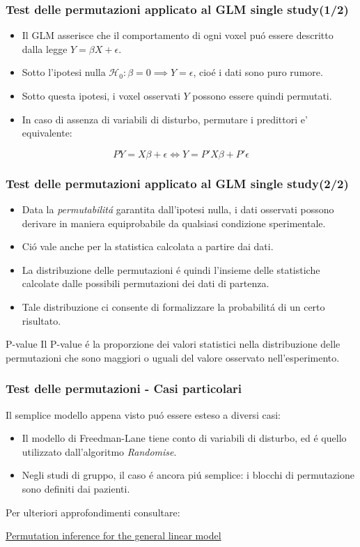 \documentclass{beamer}
\begin{document}
\begin{frame}
\frametitle{Test delle permutazioni applicato al GLM single study(1/2)}
\begin{itemize}
\item {} Il GLM asserisce che il comportamento di ogni voxel pu\'o essere descritto dalla legge $Y = \beta X + \epsilon$.
\item {}Sotto l'ipotesi nulla $\mathcal{H}_0 : \beta = 0 \implies Y = \epsilon$, cio\'e i dati sono puro rumore.
\item {}Sotto questa ipotesi, i voxel osservati $Y$ possono essere quindi \alert{permutati}.
\item {} In caso di assenza di variabili di disturbo, permutare i predittori e' equivalente:
\end{itemize}
$$PY = X\beta + \epsilon \iff Y = P'X\beta + P'\epsilon$$
\end{frame}

\begin{frame}
\frametitle{Test delle permutazioni applicato al GLM single study(2/2)}
\begin{itemize}
\item {}Data la \emph{permutabilit\'a} garantita dall'ipotesi nulla, i dati osservati possono derivare in maniera equiprobabile da qualsiasi condizione sperimentale.
\item {}Ci\'o vale anche per la statistica calcolata a partire dai dati.
\item {}La \alert{distribuzione delle permutazioni} \'e quindi l'insieme delle statistiche calcolate dalle possibili permutazioni dei dati di partenza.
\item {}Tale distribuzione ci consente di formalizzare la probabilit\'a di un certo risultato.
\end{itemize}
\begin{block}{P-value}
Il P-value \'e la proporzione dei valori statistici nella distribuzione delle permutazioni che sono maggiori o uguali del valore osservato nell'esperimento.
\end{block}
\end{frame}

\begin{frame}
\frametitle{Test delle permutazioni - Casi particolari}
Il semplice modello appena visto pu\'o essere esteso a diversi casi:
\begin{itemize}
\item Il modello di Freedman-Lane tiene conto di variabili di disturbo, ed \'e quello utilizzato dall'algoritmo \emph{Randomise}.
\item Negli studi di gruppo, il caso \'e ancora pi\'u semplice: i blocchi di permutazione sono definiti dai pazienti.
\end{itemize}
Per ulteriori approfondimenti consultare:

\center\href{http://www.sciencedirect.com/science/article/pii/S1053811914000913}{Permutation inference for the general linear model}
\end{frame}
\end{document}
